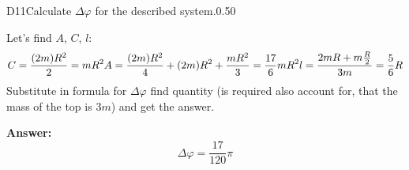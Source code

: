\documentclass[11pt,a4paper]{article}
\begin{document}
\begin{solcard}{D11}{Calculate $\Delta \varphi$ for the described system.}{0.50}

Let's find $A$, $C$, $ l$: $$ C = \frac{(2m)R^2}{2} =  mR^2 \\ A = \frac{(2m)R^2}{4} + (2m)R^2 + \frac{mR^2}{3} = \frac{17}{6}mR^2 \\ l = \frac{2m  R + m \frac{R}{2}}{3m} = \frac{5}{6}R $$Substitute in formula for $\Delta \varphi$ find quantity (is required also account for, that the mass of the top is $3m$) and get the answer.

\par\smallskip\noindent\textbf{Answer:} $$ \Delta \varphi = \frac{17}{120} \pi $$
\end{solcard}
\end{document}
